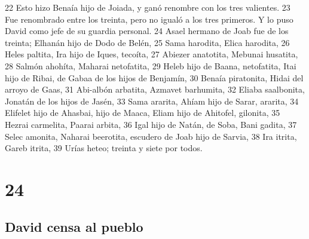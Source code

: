 22 Esto hizo Benaía hijo de Joiada, y ganó renombre con los tres valientes.
23 Fue renombrado entre los treinta, pero no igualó a los tres primeros. Y lo puso David como jefe de su guardia personal. 
24 Asael hermano de Joab fue de los treinta; Elhanán hijo de Dodo de Belén,
25 Sama harodita, Elica harodita,
26 Heles paltita, Ira hijo de Iques, tecoíta,
27 Abiezer anatotita, Mebunai husatita,
28 Salmón ahohíta, Maharai netofatita,
29 Heleb hijo de Baana, netofatita, Itai hijo de Ribai, de Gabaa de los hijos de Benjamín,
30 Benaía piratonita, Hidai del arroyo de Gaas,
31 Abi-albón arbatita, Azmavet barhumita,
32 Eliaba saalbonita, Jonatán de los hijos de Jasén,
33 Sama ararita, Ahíam hijo de Sarar, ararita, 
34 Elifelet hijo de Ahasbai, hijo de Maaca, Eliam hijo de Ahitofel, gilonita,
35 Hezrai carmelita, Paarai arbita,
36 Igal hijo de Natán, de Soba, Bani gadita,
37 Selec amonita, Naharai beerotita, escudero de Joab hijo de Sarvia,
38 Ira itrita, Gareb itrita,
39 Urías heteo; treinta y siete por todos.

\chapter{24}

\section*{David censa al pueblo}

